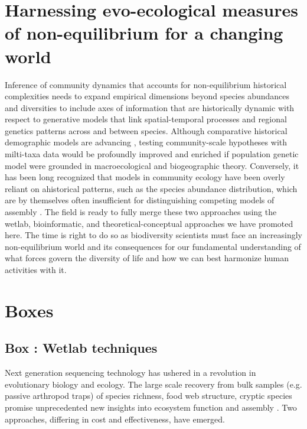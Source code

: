 \documentclass[12pt]{article}
\newcounter{Box}
\begin{document}
\section{Harnessing evo-ecological measures of non-equilibrium for a changing world}

Inference of community dynamics that accounts for non-equilibrium
historical complexities needs to expand empirical dimensions beyond
species abundances and diversities to include axes of information that
are historically dynamic with respect to generative models that link
spatial-temporal processes and regional genetics patterns across and
between species. Although comparative historical demographic models
are advancing \citep{Xue2015-el, Hickerson2006-uf, Carstens2016-mc,
  Chan2014-nq, Satler2016-l}, testing community-scale hypotheses with
milti-taxa data would be profoundly improved and enriched if
population genetic model were grounded in macroecological and
biogeographic theory.  Conversely, it has been long recognized that
models in community ecology have been overly reliant on ahistorical
patterns, such as the species abundance distribution, which are by
themselves often insufficient for distinguishing competing models of
assembly \citep{McGill2007-hx, mcgill2010}.  The field is ready to
fully merge these two approaches using the wetlab, bioinformatic, and
theoretical-conceptual approaches we have promoted here. The time is
right to do so as biodiversity scientists must face an increasingly
non-equilibrium world and its consequences for our fundamental
understanding of what forces govern the diversity of life and how we
can best harmonize human activities with it.

\pagebreak




\pagebreak

\section*{Boxes}


\label{box:wet}
\subsection*{Box \theBox: Wetlab techniques}
    
Next generation sequencing technology has ushered in a revolution in
evolutionary biology and ecology. The large scale recovery from bulk
samples (e.g. passive arthropod traps) of species richness, food web
structure, cryptic species promise unprecedented new insights into
ecosystem function and assembly \citep{krehenwinkel2016,
  shokralla2015, gibson2014, taberlet2012}.  Two approaches, differing
in cost and effectiveness, have emerged.
\end{document}
